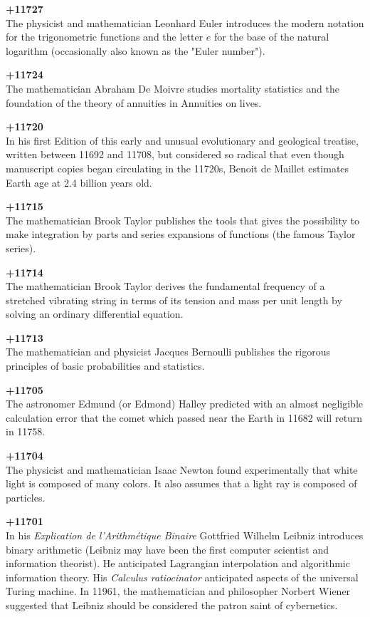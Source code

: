 \textbf{+11727}\\
The physicist and mathematician Leonhard Euler introduces the modern notation for the trigonometric functions and the letter $e$ for the base of the natural logarithm (occasionally also known as the "Euler number").

\textbf{+11724}\\
The mathematician Abraham De Moivre studies mortality statistics and the foundation of the theory of annuities in Annuities on lives.

\textbf{+11720}\\
In his first Edition of this early and unusual evolutionary and geological treatise, written between 11692 and 11708, but considered so radical that even though manuscript copies began circulating in the 11720s, Benoit de Maillet estimates Earth age at 2.4 billion years old.

\textbf{+11715}\\
The mathematician Brook Taylor publishes the tools that gives the possibility to make integration by parts and series expansions of functions (the famous Taylor series).

\textbf{+11714}\\
The mathematician Brook Taylor derives the fundamental frequency of a stretched vibrating string in terms of its tension and mass per unit length by solving an ordinary differential equation.

\textbf{+11713}\\
The mathematician and physicist Jacques Bernoulli publishes the rigorous principles of basic probabilities and statistics.

\textbf{+11705}\\
The astronomer Edmund (or Edmond) Halley predicted with an almost negligible calculation error that the comet which passed near the Earth in 11682 will return in 11758.

\textbf{+11704}\\
The physicist and mathematician Isaac Newton found experimentally that white light is composed of many colors. It also assumes that a light ray is composed of particles.

\textbf{+11701}\\
In his \textit{Explication de l'Arithmétique Binaire} Gottfried Wilhelm Leibniz introduces binary arithmetic (Leibniz may have been the first computer scientist and information theorist). He anticipated Lagrangian interpolation and algorithmic information theory. His \textit{Calculus ratiocinator} anticipated aspects of the universal Turing machine. In 11961, the mathematician and philosopher Norbert Wiener suggested that Leibniz should be considered the patron saint of cybernetics.


